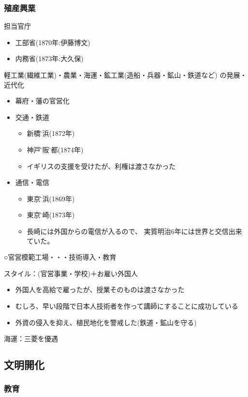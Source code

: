 \documentclass[12pt]{ltjsarticle}
\begin{document}
\subsubsection{殖産興業}
担当官庁
\begin{itemize}
\item 工部省(1870年:伊藤博文)
\item 内務省(1873年:大久保)
\end{itemize}
軽工業(繊維工業)・農業・海運・鉱工業(造船・兵器・鉱山・鉄道など)
の発展・近代化
\begin{itemize}
\item 幕府・藩の官営化
\item 交通・鉄道
\begin{itemize}
\item 新橋\~ 横浜(1872年)
\item 神戸\~ 大阪\~ 京都(1874年)
\item イギリスの支援を受けたが、利権は渡さなかった
\end{itemize}
\item 通信・電信
\begin{itemize}
\item 東京\~ 横浜(1869年)
\item 東京\~ 長崎(1873年)
\item 長崎には外国からの電信が入るので、
実質明治6年には世界と交信出来ていた。
\end{itemize}
\end{itemize}
○官営模範工場・・・技術導入・教育

スタイル：(官営事業・学校)＋お雇い外国人
\begin{itemize}
\item 外国人を高給で雇ったが、授業そのものは渡さなかった
\item むしろ、早い段階で日本人技術者を作って講師にすることに成功している
\item 外資の侵入を抑え、植民地化を警戒した(鉄道・鉱山を守る)
\end{itemize}
海運：三菱を優遇

\subsection{文明開化}
\subsubsection{教育}
\end{document}
